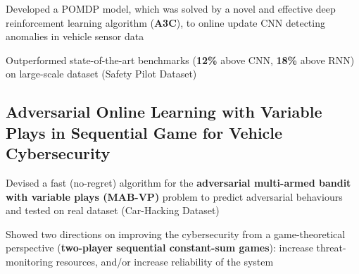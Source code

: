 \documentclass[]{Keval-resume}
\begin{document}
\begin{cvitems}
\item 
    {Developed a POMDP model, which was solved by a novel and effective deep reinforcement learning algorithm (\textbf{A3C}), to online update CNN detecting anomalies in vehicle sensor data}
\item 
    {Outperformed state-of-the-art benchmarks (\textbf{12\%} above CNN, \textbf{18\%} above RNN) on large-scale dataset (Safety Pilot Dataset)
    }
\end{cvitems}
\sectionsep

\subsection{Adversarial Online Learning with Variable Plays in Sequential Game for Vehicle Cybersecurity \hfill\normalfont 
}
\begin{cvitems}
\item 
    {Devised a fast (no-regret) algorithm for the \textbf{adversarial multi-armed bandit with variable plays (MAB-VP)} problem to predict adversarial behaviours and tested on real dataset (Car-Hacking Dataset)}
\item
    {
    Showed two directions on improving the cybersecurity from a game-theoretical perspective (\textbf{two-player sequential constant-sum games}): increase threat-monitoring resources, and/or increase reliability of the system 
    }
\end{cvitems}
\sectionsep
\end{document}
